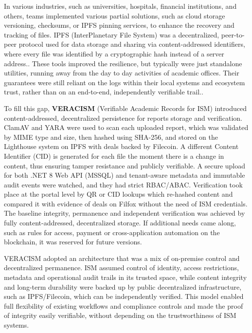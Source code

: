In various industries, such as universities, hospitals, financial institutions, and others, teams implemented various partial solutions, such as cloud storage versioning, checksums, or IPFS pinning services, to enhance the recovery and tracking of files. IPFS (InterPlanetary File System) was a decentralized, peer-to-peer protocol used for data storage and sharing via content-addressed identifiers, where every file was identified by a cryptographic hash instead of a server address.\citep{IPFSDocs2025,CryptoSTIPFS2025}. These tools improved the resilience, but typically were just standalone utilities, running away from the day to day activities of academic offices. Their guarantees were still reliant on the logs within their local systems and ecosystem trust, rather than on an end-to-end, independently verifiable trail.\citep{AWSS3Versioning2025,NIST80092r1,FilebasePinning2025,PinataPinning2025,SchneiderIPFSPinning2025,BlockchainReporterIPFS2025}.

To fill this gap, \textbf{VERACISM} (Verifiable Academic Records for ISM) introduced content-addressed, decentralized persistence for reports storage and verification. ClamAV and YARA were used to scan each uploaded report, which was validated by MIME type and size, then hashed using SHA-256, and stored on the Lighthouse system on IPFS with deals backed by Filecoin. A different Content Identifier (CID) is generated for each file the moment there is a change in content, thus ensuring tamper resistance and publicly verifiable. A secure upload for both .NET 8 Web API (MSSQL) and tenant-aware metadata and immutable audit events were watched, and they had strict RBAC/ABAC. Verification took place at the portal level by QR or CID lookups which re-hashed content and compared it with evidence of deals on Filfox without the need of ISM credentials. The baseline integrity, permanence and independent verification was achieved by fully content-addressed, decentralized storage. If additional needs came along, such as rules for access, payment or cross-application automation on the blockchain, it was reserved for future versions.

VERACISM adopted an architecture that was a mix of on-premise control and decentralized permanence. ISM assumed control of identity, access restrictions, metadata and operational audit trails in its trusted space, while content integrity and long-term durability were backed up by public decentralized infrastructure, such as IPFS/Filecoin, which can be independently verified. This model enabled full flexibility of existing workflows and compliance controls and made the proof of integrity easily verifiable, without depending on the trustworthiness of ISM systems.


